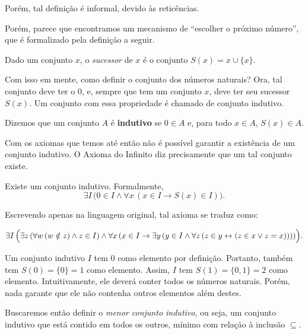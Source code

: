 Porém, tal definição é informal, devido às reticências.

Porém, parece que encontramos um mecanismo de ``escolher o próximo número'', que é formalizado pela definição a seguir.

\begin{definition}[$\BST$]\label{def:sucessor}
    Dado um conjunto $x$, o \emph{sucessor} de $x$ é o conjunto $S(x) = x \cup \{x\}$.
\end{definition}

Com isso em mente, como definir o conjunto dos números naturais?
Ora, tal conjunto deve ter o $0$, e, sempre que tem um conjunto $x$, deve ter seu sucessor $S(x)$.
Um conjunto com essa propriedade é chamado de conjunto indutivo.

\begin{definition}[$\BST$]\label{def:conjuntoIndutivo}
    Dizemos que um conjunto $A$ é \textbf{indutivo} se $0 \in A$ e, para todo $x \in A$, $S(x) \in A$.
\end{definition}

Com os axiomas que temos até então não é possível garantir a existência de um conjunto indutivo.
O Axioma do Infinito diz precisamente que um tal conjunto existe.

\begin{axiom}\label{ax:infinito}
    Existe um conjunto indutivo.
    Formalmente,
    \[
        \exists I\,\bigl(0\in I \land \forall x\,(x\in I \rightarrow S(x)\in I)\bigr).
    \]

    Escrevendo apenas na linguagem original, tal axioma se traduz como:

    \[
    \exists I\,\Bigl(
        \exists z\,(\forall w\,(w\notin z) \land z\in I)
        \land
        \forall x\,(x\in I \rightarrow \exists y\,(y\in I \land \forall z\,(z\in y \leftrightarrow (z\in x \lor z=x))))
    \Bigr).
    \]
\end{axiom}

Um conjunto indutivo $I$ tem $0$ como elemento por definição.
Portanto, também tem $S(0)=\{0\}=1$ como elemento.
Assim, $I$ tem $S(1)=\{0,1\}=2$ como elemento.
Intuitivamente, ele deverá conter todos os números naturais.
Porém, nada garante que ele não contenha outros elementos além destes.

Buscaremos então definir o \emph{menor conjunto indutivo}, ou seja, um conjunto indutivo que está contido em todos os outros, mínimo com relação à inclusão $\subseteq$.

